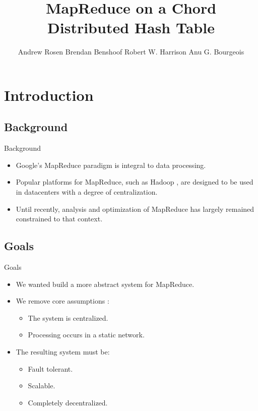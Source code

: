 \documentclass[11pt]{beamer}
\author[Andrew Rosen]{Andrew Rosen \qquad Brendan Benshoof \qquad Robert W. Harrison \qquad Anu G. Bourgeois}
\title{MapReduce on a Chord Distributed Hash Table}
\institute[Georgia State University]{Department of Computer Science\\
  Georgia State University}
\date{}
\begin{document}
\begin{frame}
\titlepage
\end{frame}

\begin{frame}
\tableofcontents
\end{frame}

\section{Introduction}

\subsection{Background}
\begin{frame}{Background}

\begin{itemize}
	\item Google's MapReduce \cite{mapreduce} paradigm is integral to data processing.
	\item Popular platforms for MapReduce, such as Hadoop \cite{hadoop}, are designed to be used in datacenters with a degree of centralization.  
	\item Until recently, analysis and optimization of MapReduce has largely remained constrained to that context.
\end{itemize}

\end{frame}

\subsection{Goals}
\begin{frame}{Goals}


\begin{itemize}
	\item We wanted build a more abstract system for MapReduce.
	\item We remove core assumptions \cite{hadoopAssumptions}:
	\begin{itemize}
		\item The system is centralized.
		\item Processing occurs in a static network.
	\end{itemize}
	\item The resulting system must be:
	\begin{itemize}
		\item Fault tolerant.
		\item Scalable.
		\item Completely decentralized.
	\end{itemize}
\end{itemize}

\end{frame}
\end{document}
